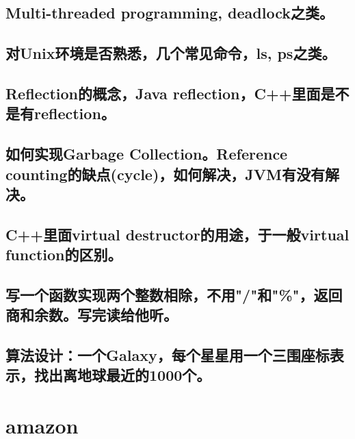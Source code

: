 \documentclass[12pt]{book}
\begin{document}
\section{Multi-threaded programming, deadlock之类。}
\label{sec-17-8}
\section{对Unix环境是否熟悉，几个常见命令，ls, ps之类。}
\label{sec-17-9}
\section{Reflection的概念，Java reflection，C++里面是不是有reflection。}
\label{sec-17-10}
\section{如何实现Garbage Collection。Reference counting的缺点(cycle)，如何解决，JVM有没有解决。}
\label{sec-17-11}
\section{C++里面virtual destructor的用途，于一般virtual function的区别。}
\label{sec-17-12}
\section{写一个函数实现两个整数相除，不用"/"和"\%"，返回商和余数。写完读给他听。}
\label{sec-17-13}
\section{算法设计：一个Galaxy，每个星星用一个三围座标表示，找出离地球最近的1000个。}
\label{sec-17-14}

\chapter{amazon}
\label{sec-18}
\end{document}

